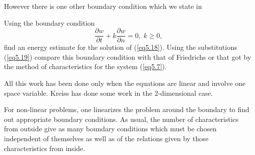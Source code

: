 However there is one other boundary condition which we state in 

\begin{exercise}\label{chap5:exer5.3}
Using the boundary condition
\begin{equation*}
\frac{\partial w}{\partial t} + k \frac{\partial w}{\partial n} = 0,
\; k \geq 0,\tag{5.21}\label{eq5.21}
\end{equation*}
find an energy estimate for the solution of (\ref{eq5.18}). Using the
substitutions (\ref{eq5.19}) compare this boundary condition with that of
Friedrichs or that got by the method of characteristics for the system
(\ref{eq5.7}). 
\end{exercise}

All this work has been done only when the equations are linear and
involve one space variable. Kreiss has done some work in the
2-dimensional case.

For non-linear problems, one linearizes the problem around the
bou\-ndary to find out appropriate boundary conditions. As usual, the
number of characteristics from outside give as many boundary
conditions which must be chosen independent of themselves as well as
of the relations given by those characteristics from inside.

